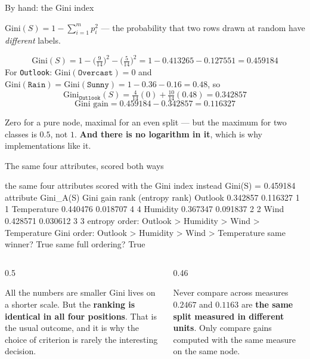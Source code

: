 \documentclass[aspectratio=169]{beamer}
\begin{document}
\begin{frame}[shrink=6]{By hand: the Gini index}
  \begin{exampleblock}{}
    \centering
    $\mathrm{Gini}(S) = 1 - \sum_{i=1}^{m} p_i^2$ \quad --- \quad the
    probability that two rows drawn at random have \emph{different} labels.
  \end{exampleblock}
  \[
    \mathrm{Gini}(S) = 1 - \Big(\tfrac{9}{14}\Big)^{\!2}
                         - \Big(\tfrac{5}{14}\Big)^{\!2}
      = 1 - 0.413265 - 0.127551 = \mathbf{0.459184}
  \]
  For \texttt{Outlook}: $\mathrm{Gini}(\texttt{Overcast}) = 0$ and
  $\mathrm{Gini}(\texttt{Rain}) = \mathrm{Gini}(\texttt{Sunny})
  = 1 - 0.36 - 0.16 = 0.48$, so
  \[
    \mathrm{Gini}_{\texttt{Outlook}}(S)
      = \tfrac{4}{14}(0) + \tfrac{10}{14}(0.48) = 0.342857
  \]
  \[
    \text{Gini gain} = 0.459184 - 0.342857 = \mathbf{0.116327}
  \]
  \begin{center}\small
    Zero for a pure node, maximal for an even split --- but the maximum for
    two classes is $0.5$, not $1$. \textbf{And there is no logarithm in it},
    which is why implementations like it.
  \end{center}
\end{frame}

\begin{frame}[fragile,shrink=8]{The same four attributes, scored both ways}
\begin{outblk}
the same four attributes scored with the Gini index instead
Gini(S) = 0.459184
attribute      Gini_A(S)   Gini gain  rank   (entropy rank)
Outlook        0.342857    0.116327    1          1
Temperature    0.440476    0.018707    4          4
Humidity       0.367347    0.091837    2          2
Wind           0.428571    0.030612    3          3
entropy order: Outlook > Humidity > Wind > Temperature
Gini    order: Outlook > Humidity > Wind > Temperature
same winner? True      same full ordering? True
\end{outblk}
\begin{columns}[T]
  \begin{column}{0.5\textwidth}
    \begin{exampleblock}{All the numbers are smaller}
      \small Gini lives on a shorter scale. But the \textbf{ranking is
      identical in all four positions}. That is the usual outcome, and it is
      why the choice of criterion is rarely the interesting decision.
    \end{exampleblock}
  \end{column}
  \begin{column}{0.46\textwidth}
    \begin{alertblock}{Never compare across measures}
      \small $0.2467$ and $0.1163$ are \textbf{the same split measured in
      different units}. Only compare gains computed with the same measure on
      the same node.
    \end{alertblock}
  \end{column}
\end{columns}
\end{frame}
\end{document}
